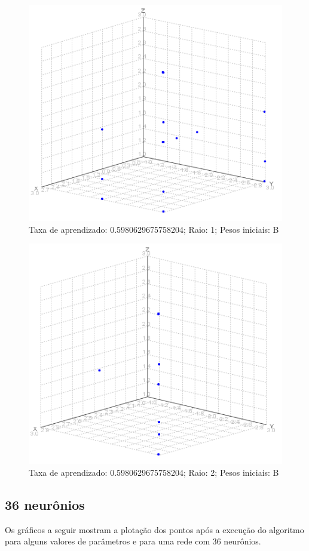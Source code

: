 \begin{figure}[ht!]
	\centering
	\includegraphics[scale=0.65]{./imgs/2b1.png}
	\caption{Taxa de aprendizado: 0.5980629675758204; Raio: 1; Pesos iniciais: B}
\end{figure}

\begin{figure}[ht!]
	\centering
	\includegraphics[scale=0.65]{./imgs/2b2.png}
	\caption{Taxa de aprendizado: 0.5980629675758204; Raio: 2; Pesos iniciais: B}
\end{figure}

\subsection{36 neurônios}
Os gráficos a seguir mostram a plotação dos pontos após a execução do algoritmo para alguns valores de parâmetros e para
uma rede com 36 neurônios.

